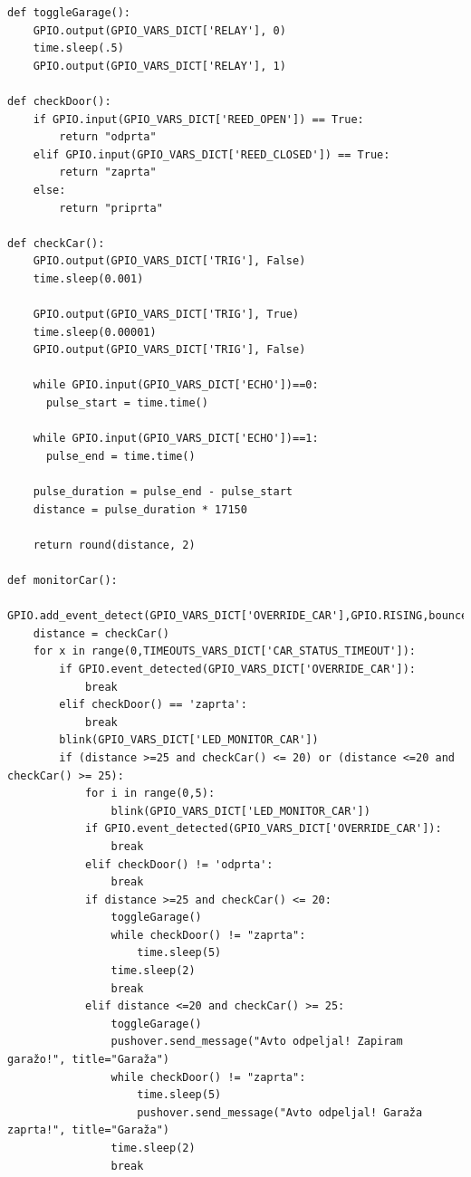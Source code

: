 \documentclass[11pt]{article}
\begin{document}
\begin{verbatim}
def toggleGarage():
    GPIO.output(GPIO_VARS_DICT['RELAY'], 0)
    time.sleep(.5)
    GPIO.output(GPIO_VARS_DICT['RELAY'], 1)

def checkDoor():
    if GPIO.input(GPIO_VARS_DICT['REED_OPEN']) == True:
        return "odprta"
    elif GPIO.input(GPIO_VARS_DICT['REED_CLOSED']) == True:
        return "zaprta"
    else:
        return "priprta"

def checkCar():
    GPIO.output(GPIO_VARS_DICT['TRIG'], False)
    time.sleep(0.001)

    GPIO.output(GPIO_VARS_DICT['TRIG'], True)
    time.sleep(0.00001)
    GPIO.output(GPIO_VARS_DICT['TRIG'], False)

    while GPIO.input(GPIO_VARS_DICT['ECHO'])==0:
      pulse_start = time.time()

    while GPIO.input(GPIO_VARS_DICT['ECHO'])==1:
      pulse_end = time.time()

    pulse_duration = pulse_end - pulse_start
    distance = pulse_duration * 17150

    return round(distance, 2)

def monitorCar():
    GPIO.add_event_detect(GPIO_VARS_DICT['OVERRIDE_CAR'],GPIO.RISING,bouncetime=300)
    distance = checkCar()
    for x in range(0,TIMEOUTS_VARS_DICT['CAR_STATUS_TIMEOUT']):
        if GPIO.event_detected(GPIO_VARS_DICT['OVERRIDE_CAR']):
            break
        elif checkDoor() == 'zaprta':
            break
        blink(GPIO_VARS_DICT['LED_MONITOR_CAR'])
        if (distance >=25 and checkCar() <= 20) or (distance <=20 and checkCar() >= 25):
            for i in range(0,5):
                blink(GPIO_VARS_DICT['LED_MONITOR_CAR'])
            if GPIO.event_detected(GPIO_VARS_DICT['OVERRIDE_CAR']):
                break
            elif checkDoor() != 'odprta':
                break
            if distance >=25 and checkCar() <= 20:
                toggleGarage()
                while checkDoor() != "zaprta":
                    time.sleep(5)
                time.sleep(2)
                break
            elif distance <=20 and checkCar() >= 25:
                toggleGarage()
                pushover.send_message("Avto odpeljal! Zapiram garažo!", title="Garaža")
                while checkDoor() != "zaprta":
                    time.sleep(5)
                    pushover.send_message("Avto odpeljal! Garaža zaprta!", title="Garaža")
                time.sleep(2)
                break


\end{verbatim}
\end{document}
